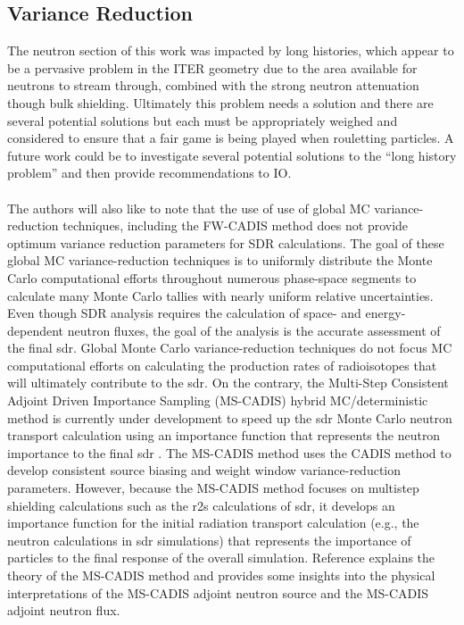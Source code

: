 \documentclass[12pt]{article}
\begin{document}
\subsection*{Variance Reduction}
The neutron section of this work was impacted by long histories, which appear to
be a pervasive problem in the ITER geometry due to the area available for
neutrons to stream through, combined with the strong neutron attenuation though
bulk shielding. Ultimately this problem needs a solution and there are several
potential solutions but each must be appropriately weighed and considered to
ensure that a fair game is being played when rouletting particles. A future
work could be to investigate several potential solutions to the ``long history
problem'' and then provide recommendations to IO.
\\
\\
The authors will also like to note that the use of use of global MC 
variance-reduction techniques, including the FW-CADIS method does not 
provide optimum variance reduction parameters for SDR calculations. 
The goal of these global MC variance-reduction techniques is to uniformly 
distribute the Monte Carlo computational efforts throughout numerous 
phase-space segments to calculate many Monte Carlo tallies with nearly 
uniform relative uncertainties. Even though SDR analysis requires the 
calculation of space- and energy-dependent neutron fluxes, the goal of 
the analysis is the accurate assessment of the final \gls{sdr}. Global 
Monte Carlo variance-reduction techniques do not focus MC computational 
efforts on calculating the production rates of radioisotopes that will 
ultimately contribute to the \gls{sdr}. On the contrary, the Multi-Step 
Consistent Adjoint Driven Importance Sampling (MS-CADIS) hybrid 
MC/deterministic method is currently under development to speed up the \gls{sdr}
 Monte Carlo neutron transport calculation using an importance function that 
represents the neutron importance to the final \gls{sdr} \cite{mscadis}. 
The MS-CADIS method uses the CADIS method to develop consistent source biasing 
and weight window variance-reduction parameters. However, because the MS-CADIS 
method focuses on multistep shielding calculations such as the \gls{r2s} 
calculations of \gls{sdr}, it develops an importance function for the initial 
radiation transport calculation (e.g., the neutron calculations in \gls{sdr} 
simulations) that represents the importance of particles to the final response
 of the overall simulation. Reference \cite{mscadis} explains the theory of the MS-CADIS 
method and provides some insights into the physical interpretations of the 
MS-CADIS adjoint neutron source and the MS-CADIS adjoint neutron flux.
\end{document}
